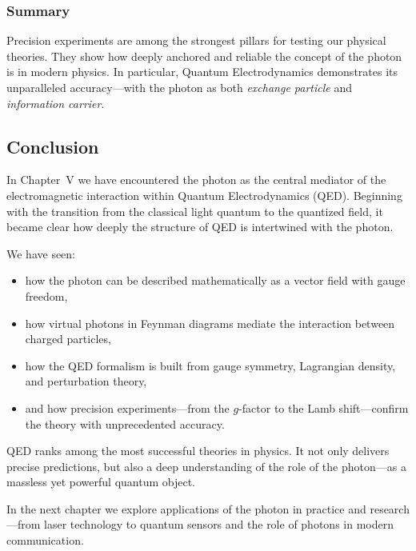 \subsubsection{Summary}

Precision experiments are among the strongest pillars for testing our physical theories. They show how deeply anchored and reliable the concept of the photon is in modern physics. In particular, Quantum Electrodynamics demonstrates its unparalleled accuracy—with the photon as both \emph{exchange particle} and \emph{information carrier}.

\subsection{Conclusion}

In Chapter~V we have encountered the photon as the central mediator of the electromagnetic interaction within Quantum Electrodynamics (QED). Beginning with the transition from the classical light quantum to the quantized field, it became clear how deeply the structure of QED is intertwined with the photon.

We have seen:
\begin{itemize}
	\item how the photon can be described mathematically as a vector field with gauge freedom,
	\item how virtual photons in Feynman diagrams mediate the interaction between charged particles,
	\item how the QED formalism is built from gauge symmetry, Lagrangian density, and perturbation theory,
	\item and how precision experiments—from the $g$-factor to the Lamb shift—confirm the theory with unprecedented accuracy.
\end{itemize}

QED ranks among the most successful theories in physics. It not only delivers precise predictions, but also a deep understanding of the role of the photon—as a massless yet powerful quantum object.

\vspace{1em}
\begin{tcolorbox}[hinweisbox,title=Outlook to Chapter VI]
	\label{box:Ausblick auf Kapitel 6}
	In the next chapter we explore applications of the photon in practice and research—from laser technology to quantum sensors and the role of photons in modern communication.
\end{tcolorbox}

